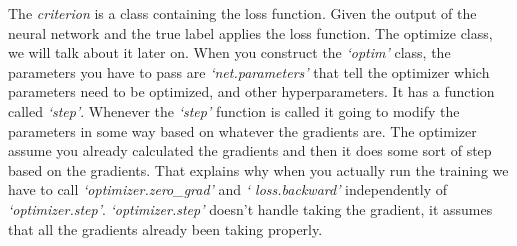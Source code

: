 The \emph{criterion} is a class containing the loss function. Given the output of the neural network and the true label applies the loss function. The optimize class, we will talk about it later on. When you construct the \emph{`optim'} class,  the parameters you have to pass are \emph{`net.parameters'} that tell the optimizer which parameters need to be optimized, and other hyperparameters. It has a function called \emph{`step'}. Whenever the \emph{`step'} function is called it going to modify the parameters in some way based on whatever the gradients are. The optimizer assume you already calculated the gradients and then it does some sort of step based on the gradients. That explains why when you actually run the training we have to call \emph{`optimizer.zero\_grad'} and \emph{` loss.backward'} independently of \emph{`optimizer.step'}. \emph{`optimizer.step'} doesn't handle taking the gradient, it assumes that all the gradients already been taking properly.
 
